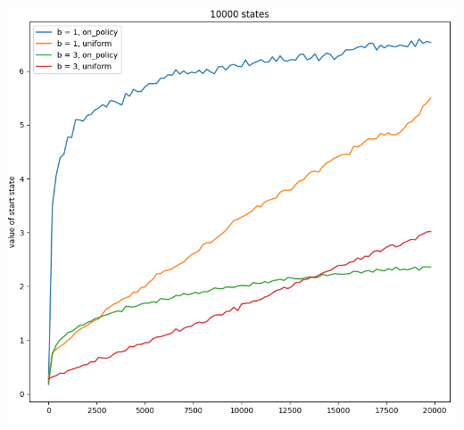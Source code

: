 \documentclass[11pt]{article}
\begin{document}
    \includegraphics[scale=0.7]{exercise_8_8}
\end{document}
